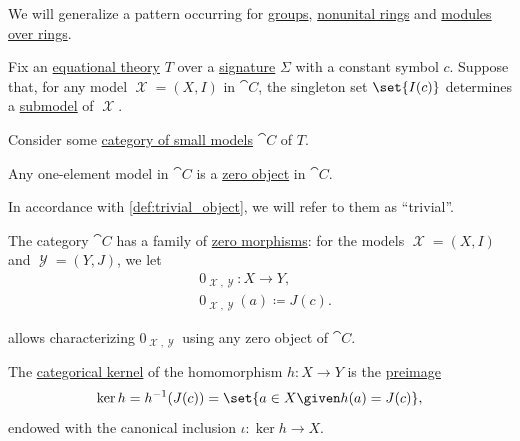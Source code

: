 \begin{proposition}\label{thm:equational_theory_zero_morphisms}
  We will generalize a pattern occurring for \hyperref[def:group]{groups}, \hyperref[def:ring]{nonunital rings} and \hyperref[def:module]{modules over rings}.

  Fix an \hyperref[def:fol_equational_theory]{equational theory} \( T \) over a \hyperref[def:fol_signature]{signature} \( \Sigma \) with a constant symbol \( c \). Suppose that, for any model \( \mscrX = (X, I) \) in \( \cat{C} \), the singleton set \( \set{ I(c) } \) determines a \hyperref[def:fol_substructure/submodel]{submodel} of \( \mscrX \).

  Consider some \hyperref[def:fol_theory_model_functor/obj]{category of small models} \( \cat{C} \) of \( T \).

  \begin{thmenum}
     Any one-element model in \( \cat{C} \) is a \hyperref[def:universal_objects/zero]{zero object} in \( \cat{C} \).

    In accordance with \cref{def:trivial_object}, we will refer to them as \enquote{trivial}.

     The category \( \cat{C} \) has a family of \hyperref[def:zero_morphism]{zero morphisms}: for the models \( \mscrX = (X, I) \) and \( \mscrY = (Y, J) \), we let
    \begin{equation}\label{eq:thm:equational_theory_zero_morphisms/morphism}
      \begin{aligned}
        &0_{\mscrX, \mscrY}: X \to Y, \\
        &0_{\mscrX, \mscrY}(a) \coloneqq J(c).
      \end{aligned}
    \end{equation}

     allows characterizing \( 0_{\mscrX, \mscrY} \) using any zero object of \( \cat{C} \).

     The \hyperref[def:categorical_kernels/kernel]{categorical kernel} of the homomorphism \( h: X \to Y \) is the \hyperref[def:set_valued_function/inverse]{preimage}
    \begin{equation}\label{eq:thm:equational_theory_zero_morphisms/kernel}
      \ker h = h^{-1}(J(c)) = \set{ a \in X \given h(a) = J(c) },
    \end{equation}
    endowed with the canonical inclusion \( \iota: \ker h \to X \).


\end{thmenum}
\end{proposition}
